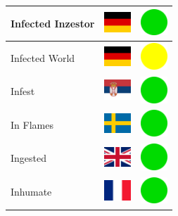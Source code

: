 \documentclass[12pt, a4paper, twoside]{report}
\begin{document}
\begin{center}
\begin{longtable}{|p{5cm}|p{2cm}|p{2cm}|}
 Infected Inzestor                                          & \includegraphics[width=1cm]{../4x3/de} &   \includegraphics[width=1cm]{../likes/y} \\ \hline
 Infected World                                             & \includegraphics[width=1cm]{../4x3/de} &   \includegraphics[width=1cm]{../likes/m} \\ \hline
 Infest                                                     & \includegraphics[width=1cm]{../4x3/rs} &   \includegraphics[width=1cm]{../likes/y} \\ \hline
 In Flames                                                  & \includegraphics[width=1cm]{../4x3/se} &   \includegraphics[width=1cm]{../likes/y} \\ \hline
 Ingested                                                   & \includegraphics[width=1cm]{../4x3/gb} &   \includegraphics[width=1cm]{../likes/y} \\ \hline
 Inhumate                                                   & \includegraphics[width=1cm]{../4x3/fr} &   \includegraphics[width=1cm]{../likes/y} \\ \hline

\end{longtable}
\end{center}
\end{document}
